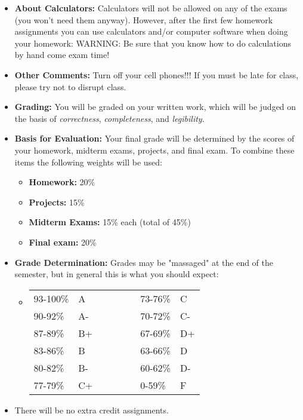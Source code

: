 \documentclass[12pt]{article}
\begin{document}
\begin{itemize}
  \item[] {\bf About Calculators:} Calculators will not be allowed on any of the exams (you won't need them anyway).  However, after the first few homework assignments you can use calculators and/or computer software when doing your homework:  WARNING:  Be sure that you know how to do calculations by hand come exam time!
   \item[] {\bf Other Comments:} Turn off your cell phones!!!  If you must be late for class, please try not to disrupt class.
\end{itemize}


\begin{itemize}
  \item[] {\bf Grading:} You will be graded on your written work, which will be judged on the basis of {\it correctness}, {\it completeness}, and {\it legibility}.
  \item[] {\bf Basis for Evaluation:} Your final grade will be determined by the scores of your homework, midterm exams, projects, and final exam.  To combine these items the following weights will be used:
  \begin{itemize}
  \item[] {\bf Homework:} 20\%
  \item[]  {\bf Projects:} 15\%
  \item[] {\bf Midterm Exams:} 15\% each (total of 45\%)
  \item[] {\bf Final exam:} 20\%
\end{itemize}

  \item[] {\bf Grade Determination:} Grades may be "massaged" at the end of the semester, but in general this is what you should expect:
\begin{itemize}
\item[] \begin{tabular}{@{}llllllll}
93-100\%   & A &&&&& 73-76\% & C \\
90-92\%   & A- &&&&& 70-72\% & C- \\
87-89\%   & B+ &&&&&  67-69\% & D+\\
83-86\% & B &&&&& 63-66\% & D \\
80-82\% & B- &&&&& 60-62\% & D- \\
77-79\% & C+ &&&&& 0-59\% & F \\
\end{tabular}
\end{itemize}
  
  \item[] There will be no extra credit assignments.

\end{itemize}
\end{document}
